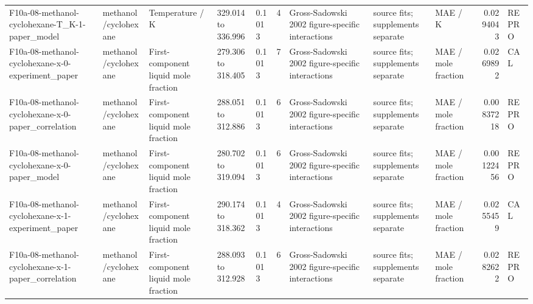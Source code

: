 \begin{landscape}
\begin{longtable}{L{1.9cm}L{2.5cm}L{2.1cm}L{1.6cm}L{1.6cm}rL{2.4cm}L{1.9cm}L{2.2cm}rL{1cm}}
F10a-\allowbreak{}08-\allowbreak{}methanol-\allowbreak{}cyclohexane-\allowbreak{}T\_\allowbreak{}K-\allowbreak{}1-\allowbreak{}paper\_\allowbreak{}model & methanol/\allowbreak{}cyclohexane & Temperature /\allowbreak{} K & 329.014 to 336.996 & 0.1013 & 4 & Gross-\allowbreak{}Sadowski 2002 figure-\allowbreak{}specific interactions & source fits; supplements separate & MAE /\allowbreak{} K & 0.0294043 & REPRO \\
F10a-\allowbreak{}08-\allowbreak{}methanol-\allowbreak{}cyclohexane-\allowbreak{}x-\allowbreak{}0-\allowbreak{}experiment\_\allowbreak{}paper & methanol/\allowbreak{}cyclohexane & First-\allowbreak{}component liquid mole fraction & 279.306 to 318.405 & 0.1013 & 7 & Gross-\allowbreak{}Sadowski 2002 figure-\allowbreak{}specific interactions & source fits; supplements separate & MAE /\allowbreak{} mole fraction & 0.0269892 & CAL \\
F10a-\allowbreak{}08-\allowbreak{}methanol-\allowbreak{}cyclohexane-\allowbreak{}x-\allowbreak{}0-\allowbreak{}paper\_\allowbreak{}correlation & methanol/\allowbreak{}cyclohexane & First-\allowbreak{}component liquid mole fraction & 288.051 to 312.886 & 0.1013 & 6 & Gross-\allowbreak{}Sadowski 2002 figure-\allowbreak{}specific interactions & source fits; supplements separate & MAE /\allowbreak{} mole fraction & 0.00837218 & REPRO \\
F10a-\allowbreak{}08-\allowbreak{}methanol-\allowbreak{}cyclohexane-\allowbreak{}x-\allowbreak{}0-\allowbreak{}paper\_\allowbreak{}model & methanol/\allowbreak{}cyclohexane & First-\allowbreak{}component liquid mole fraction & 280.702 to 319.094 & 0.1013 & 6 & Gross-\allowbreak{}Sadowski 2002 figure-\allowbreak{}specific interactions & source fits; supplements separate & MAE /\allowbreak{} mole fraction & 0.00122456 & REPRO \\
F10a-\allowbreak{}08-\allowbreak{}methanol-\allowbreak{}cyclohexane-\allowbreak{}x-\allowbreak{}1-\allowbreak{}experiment\_\allowbreak{}paper & methanol/\allowbreak{}cyclohexane & First-\allowbreak{}component liquid mole fraction & 290.174 to 318.362 & 0.1013 & 4 & Gross-\allowbreak{}Sadowski 2002 figure-\allowbreak{}specific interactions & source fits; supplements separate & MAE /\allowbreak{} mole fraction & 0.0255459 & CAL \\
F10a-\allowbreak{}08-\allowbreak{}methanol-\allowbreak{}cyclohexane-\allowbreak{}x-\allowbreak{}1-\allowbreak{}paper\_\allowbreak{}correlation & methanol/\allowbreak{}cyclohexane & First-\allowbreak{}component liquid mole fraction & 288.093 to 312.928 & 0.1013 & 6 & Gross-\allowbreak{}Sadowski 2002 figure-\allowbreak{}specific interactions & source fits; supplements separate & MAE /\allowbreak{} mole fraction & 0.0282622 & REPRO \\

\end{longtable}
\end{landscape}
